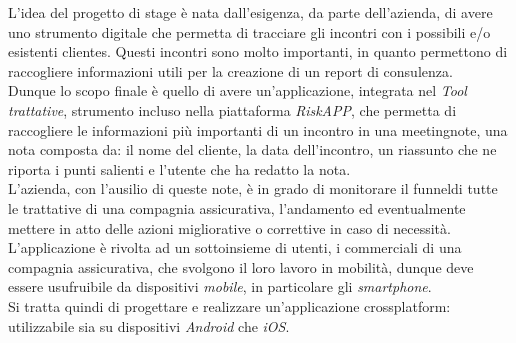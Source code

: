 L'idea del progetto di stage è nata dall'esigenza, da parte dell'azienda, di avere uno strumento digitale che permetta di tracciare gli incontri con i possibili e/o esistenti \glspl{cliente}\glsoccur.
Questi incontri sono molto importanti, in quanto permettono di raccogliere informazioni utili per la creazione di un report di consulenza.\\
Dunque lo scopo finale è quello di avere un'applicazione, integrata nel \emph{Tool trattative}, strumento incluso nella piattaforma \emph{RiskAPP}, che permetta di raccogliere le informazioni più importanti di un incontro in una \gls{meetingnote}\glsoccur, una nota composta da: il nome del \gls{cliente}\glsoccur, la data dell'incontro, un riassunto che ne riporta i punti salienti e l'utente che ha redatto la nota.\\
L'azienda, con l'ausilio di queste note, è in grado di monitorare il \gls{funnel}\glsoccur di tutte le trattative di una compagnia assicurativa, l'andamento ed eventualmente mettere in atto delle azioni migliorative o correttive in caso di necessità.\\
L'applicazione è rivolta ad un sottoinsieme di utenti, i commerciali di una compagnia assicurativa, che svolgono il loro lavoro in mobilità, dunque deve essere usufruibile da dispositivi \emph{mobile}, in particolare gli \emph{smartphone}.\\
Si tratta quindi di progettare e realizzare un'applicazione \gls{crossplatform}\glsoccur: utilizzabile sia su dispositivi \emph{Android} che \emph{iOS}.


    
    
    
    
    
